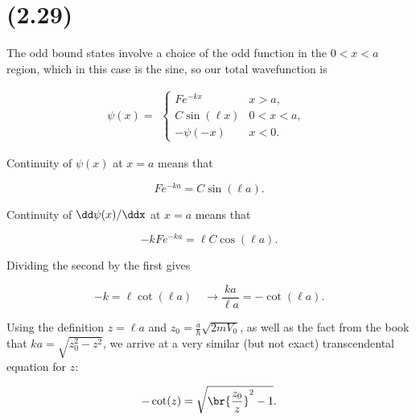 \section{(2.29)}

The odd bound states involve a choice of the odd function in the $0<x<a$ region, which in this case is the sine, so our total wavefunction is

\begin{equation}
    \psi(x) = 
        \begin{alignedat}{1}
        \begin{cases}
            Fe^{-kx} \qquad & x>a, \\
            C\sin(\ell x)   & 0<x<a, \\
            -\psi(-x)       & x<0.
        \end{cases}
        \end{alignedat}
\end{equation}

Continuity of $\psi(x)$ at $x=a$ means that

\begin{equation*}
    Fe^{-ka} = C\sin(\ell a).
\end{equation*}

Continuity of $\dd\psi(x)/\ddx$ at $x=a$ means that

\begin{equation*}
    -kFe^{-ka} = \ell C\cos(\ell a).
\end{equation*}

Dividing the second by the first gives

\begin{equation*}
    -k = \ell\cot(\ell a) \quad \rightarrow \frac{ka}{\ell a} = -\cot(\ell a).
\end{equation*}

Using the definition $z = \ell a$ and $z_0 = \frac{a}{\hbar}\sqrt{2mV_0}$, as well as the fact from the book that $ka = \sqrt{z_0^2 - z^2}$, we arrive at a very similar (but not exact) transcendental equation for $z$:

\begin{equation}
    -\cot(z) = \sqrt{\br{\frac{z_0}{z}}^2 - 1}.\label{eq:Prblm3-TranscendentalEQ}
\end{equation}


